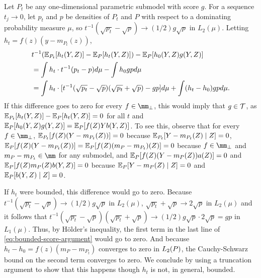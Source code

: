 Let $P_t$ be any one-dimensional parametric submodel with score $g$. For a sequence $t_j \to 0$, let $p_t$ and $p$ be densities of $P_{t}$ and $P$ 
with respect to a dominating probability measure $\mu$, so $t^{-1}(\sqrt{p_t}-\sqrt{p}) \to (1/2)g\sqrt{p}$ in $L_2(\mu)$.
Letting $h_t = f(z)(y-m_{P_t}(z))$, 
\begin{equation}
\label{eq:bounded-score-argument}
\begin{aligned} 
&t^{-1}(\E_{P_{t}}[h_{t}(Y,Z)] - \E_{P}[h_{t}(Y,Z)]) - \E_{P}[h_0(Y,Z)g(Y,Z)] \\
&= \int h_t \cdot t^{-1}(p_t - p) d\mu - \int h_0 g p d\mu \\
&= \int h_t \cdot [t^{-1}(\sqrt{p_t} - \sqrt{p})(\sqrt{p_t} + \sqrt{p}) - gp]d\mu + \int (h_t-h_0) g p d\mu.
\end{aligned}
\end{equation}
If this difference goes to zero for every $f \in \mm_{\perp}$, 
this would imply that $g \in \mathcal{T}$,
as $\E_{P_{t}}[h_{t}(Y,Z)] - \E_{P}[h_{t}(Y,Z)]=0$ for all $t$ and $\E_{P}[h_0(Y,Z)g(Y,Z)]=\E_P[f(Z)Yb(Y,Z)]$.
To see this, observe that for every $f \in \mm_{\perp}$,
$\E_{P_t}[f(Z)(Y-m_{P_t}(Z))] = 0$ because $\E_{P_t}[Y-m_{P_t}(Z)\mid Z]=0$,
$\E_{P}[f(Z)(Y-m_{P_t}(Z))] = \E_{P}[f(Z)(m_P-m_{P_t})(Z)] = 0$ 
because $f \in \mm_{\perp}$ and $m_P - m_{P_t} \in \mm$ for any submodel,
and $\E_P[f(Z)(Y-m_P(Z))a(Z)] = 0$ and $\E_P[f(Z)m_P(Z)b(Y,Z)]=0$
because $\E_P[Y-m_{P}(Z)\mid Z]=0$ and $\E_P[b(Y,Z) \mid Z]=0$.

If $h_t$ were bounded, this difference would go to zero.
Because $t^{-1}(\sqrt{p_t} - \sqrt{p}) \to (1/2)g\sqrt{p}$ in $L_2(\mu)$,
$\sqrt{p_t} + \sqrt{p} \to 2\sqrt{p}$ in $L_2(\mu)$ and it follows that $t^{-1}(\sqrt{p_t} - \sqrt{p})(\sqrt{p_t} + \sqrt{p}) \to (1/2)g\sqrt{p} \cdot 2\sqrt{p} = gp$ in $L_1(\mu)$.
Thus, by H\"older's inequality, the first term in the last line of \eqref{eq:bounded-score-argument} would go to zero. And because 
$h_t-h_0 = f(z)(m_P - m_{P_t})$ converges to zero in $L_2(\P)$, the Cauchy-Schwarz bound on the second term converges to zero. 
We conclude by using a truncation argument to show that this happens though $h_t$ is not, in general, bounded.


